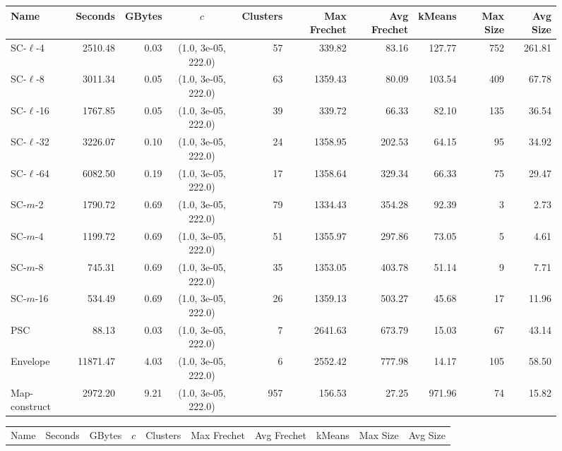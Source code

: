 \documentclass[11pt]{article}
\begin{document}
\clearpage
\newpage 
%
\clearpage
\begin{figure} \begin{center}
    \begin{minipage}{\textwidth}
    {
    \begin{tabular}{@{}lrrcrrrrrr@{}}
        \toprule
        Name & Seconds & GBytes & $c$ & Clusters & Max Frechet & Avg Frechet & kMeans & Max Size & Avg Size\\
        \midrule
        SC-$\ell$-4 & 2510.48 & 0.03 & (1.0, 3e-05, 222.0) & 57 & 339.82 & 83.16 & 127.77 & 752 & 261.81\\
        SC-$\ell$-8 & 3011.34 & 0.05 & (1.0, 3e-05, 222.0) & 63 & 1359.43 & 80.09 & 103.54 & 409 & 67.78\\
        SC-$\ell$-16 & 1767.85 & 0.05 & (1.0, 3e-05, 222.0) & 39 & 339.72 & 66.33 & 82.10 & 135 & 36.54\\
        SC-$\ell$-32 & 3226.07 & 0.10 & (1.0, 3e-05, 222.0) & 24 & 1358.95 & 202.53 & 64.15 & 95 & 34.92\\
        SC-$\ell$-64 & 6082.50 & 0.19 & (1.0, 3e-05, 222.0) & 17 & 1358.64 & 329.34 & 66.33 & 75 & 29.47\\
        SC-$m$-2 & 1790.72 & 0.69 & (1.0, 3e-05, 222.0) & 79 & 1334.43 & 354.28 & 92.39 & 3 & 2.73\\
        SC-$m$-4 & 1199.72 & 0.69 & (1.0, 3e-05, 222.0) & 51 & 1355.97 & 297.86 & 73.05 & 5 & 4.61\\
        SC-$m$-8 & 745.31 & 0.69 & (1.0, 3e-05, 222.0) & 35 & 1353.05 & 403.78 & 51.14 & 9 & 7.71\\
        SC-$m$-16 & 534.49 & 0.69 & (1.0, 3e-05, 222.0) & 26 & 1359.13 & 503.27 & 45.68 & 17 & 11.96\\
        PSC & 88.13 & 0.03 & (1.0, 3e-05, 222.0) & 7 & 2641.63 & 673.79 & 15.03 & 67 & 43.14\\
        Envelope & 11871.47 & 4.03 & (1.0, 3e-05, 222.0) & 6 & 2552.42 & 777.98 & 14.17 & 105 & 58.50\\
        Map-construct & 2972.20 & 9.21 & (1.0, 3e-05, 222.0) & 957 & 156.53 & 27.25 & 971.96 & 74 & 15.82\\
        \bottomrule
    \end{tabular}
    }
    {
    \begin{tabular}{@{}lrrcrrrrrr@{}}
        \toprule
        Name & Seconds & GBytes & $c$ & Clusters & Max Frechet & Avg Frechet & kMeans & Max Size & Avg Size\\

\end{tabular}}
\end{minipage}
\end{center}
\end{figure}
\end{document}
